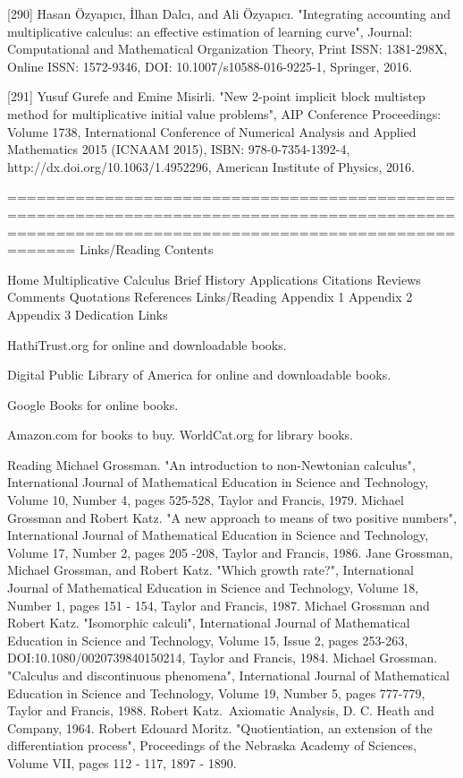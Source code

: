 \documentclass[12pt]{article}
\begin{document}
[290] Hasan Özyapıcı, İlhan Dalcı, and Ali Özyapıcı. "Integrating accounting and multiplicative calculus: an effective estimation of learning curve", Journal: Computational and Mathematical Organization Theory, Print ISSN: 1381-298X, Online ISSN: 1572-9346, DOI: 10.1007/s10588-016-9225-1, Springer, 2016.

[291] Yusuf Gurefe and Emine Misirli. "New 2-point implicit block multistep method for multiplicative initial value problems", AIP Conference Proceedings: Volume 1738, International Conference of Numerical Analysis and Applied Mathematics 2015 (ICNAAM 2015), ISBN: 978-0-7354-1392-4, http://dx.doi.org/10.1063/1.4952296, American Institute of Physics, 2016.


=================================================================================================================================================
Links/Reading
Contents

Home
Multiplicative Calculus
Brief History
Applications
Citations
Reviews
Comments
Quotations
References
Links/Reading
Appendix 1
Appendix 2
Appendix 3
Dedication
Links


HathiTrust.org for online and downloadable books.

Digital Public Library of America for online and downloadable books.

Google Books for online books.

Amazon.com for books to buy.
WorldCat.org for library books.


Reading
Michael Grossman. "An introduction to non-Newtonian calculus", International Journal of Mathematical Education in Science and Technology, Volume 10, Number 4, pages 525-528, Taylor and Francis, 1979.
Michael Grossman and Robert Katz. "A new approach to means of two positive numbers", International Journal of Mathematical Education in Science and Technology, Volume 17, Number 2, pages 205 -208, Taylor and Francis, 1986.
Jane Grossman, Michael Grossman, and Robert Katz. "Which growth rate?", International Journal of Mathematical Education in Science and Technology, Volume 18, Number 1, pages 151 - 154, Taylor and Francis, 1987.
Michael Grossman and Robert Katz. "Isomorphic calculi", International Journal of Mathematical Education in Science and Technology, Volume 15, Issue 2, pages 253-263, DOI:10.1080/0020739840150214, Taylor and Francis, 1984.
Michael Grossman. "Calculus and discontinuous phenomena", International Journal of Mathematical Education in Science and Technology, Volume 19, Number 5, pages 777-779, Taylor and Francis, 1988.
Robert Katz. Axiomatic Analysis, D. C. Heath and Company, 1964.
Robert Edouard Moritz. "Quotientiation, an extension of the differentiation process", Proceedings of the Nebraska Academy of Sciences, Volume VII, pages 112 - 117, 1897 - 1890.
\end{document}
